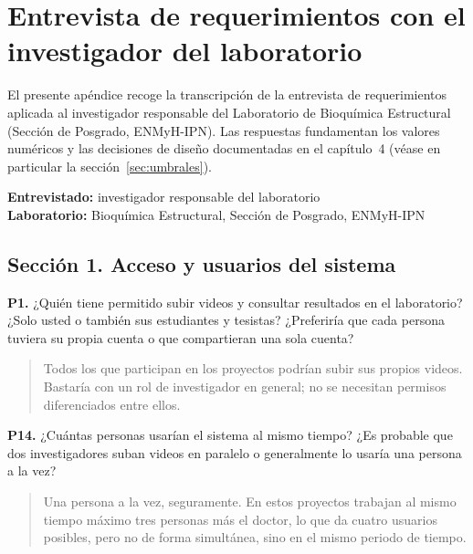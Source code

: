 
\chapter{Entrevista de requerimientos con el investigador del laboratorio}
\label{ap:entrevista}

El presente apéndice recoge la transcripción de la entrevista de requerimientos
aplicada al investigador responsable del Laboratorio de Bioquímica Estructural (Sección de Posgrado, ENMyH-IPN). Las respuestas fundamentan los valores numéricos y las decisiones de
diseño documentadas en el capítulo~4 (véase en particular la sección~\ref{sec:umbrales}).

\bigskip
\noindent\textbf{Entrevistado:} investigador responsable del laboratorio \\
\textbf{Laboratorio:} Bioquímica Estructural, Sección de Posgrado, ENMyH-IPN

\section*{Sección 1. Acceso y usuarios del sistema}

\textbf{P1.} ¿Quién tiene permitido subir videos y consultar resultados en el
laboratorio? ¿Solo usted o también sus estudiantes y tesistas? ¿Preferiría que cada
persona tuviera su propia cuenta o que compartieran una sola cuenta?

\begin{quote}
Todos los que participan en los proyectos podrían subir sus propios videos. Bastaría
con un rol de investigador en general; no se necesitan permisos diferenciados entre
ellos.
\end{quote}

\textbf{P14.} ¿Cuántas personas usarían el sistema al mismo tiempo? ¿Es probable que
dos investigadores suban videos en paralelo o generalmente lo usaría una persona a la vez?

\begin{quote}
Una persona a la vez, seguramente. En estos proyectos trabajan al mismo tiempo máximo
tres personas más el doctor, lo que da cuatro usuarios posibles, pero no de forma
simultánea, sino en el mismo periodo de tiempo.
\end{quote}

